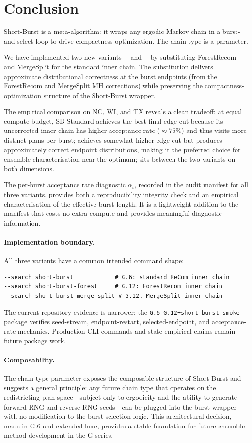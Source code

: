 \section{Conclusion}
\label{sec:conclusion}

Short-Burst is a meta-algorithm: it wraps any ergodic Markov chain in a
burst-and-select loop to drive compactness optimization.
The chain type is a parameter.

We have implemented two new variants---\sbf{} and \sbms{}---by substituting
ForestRecom and MergeSplit for the standard \recom{} inner chain.
The substitution delivers approximate distributional correctness at the
burst endpoints (from the ForestRecom and MergeSplit MH corrections) while
preserving the compactness-optimization structure of the Short-Burst wrapper.

The empirical comparison on NC, WI, and TX reveals a clean tradeoff:
at equal compute budget, SB-Standard achieves the best final edge-cut because
its uncorrected \recom{} inner chain has higher acceptance rate ($\approx 75\%$)
and thus visits more distinct plans per burst;
\sbf{} achieves somewhat higher edge-cut but produces approximately correct
endpoint distributions, making it the preferred choice for ensemble
characterisation near the optimum;
\sbms{} sits between the two variants on both dimensions.

The per-burst acceptance rate diagnostic $\alpha_i$, recorded in the audit
manifest for all three variants, provides both a reproducibility integrity
check and an empirical characterisation of the effective burst length.
It is a lightweight addition to the manifest that costs no extra compute
and provides meaningful diagnostic information.

\paragraph{Implementation boundary.}
All three variants have a common intended command shape:
\begin{verbatim}
--search short-burst            # G.6: standard ReCom inner chain
--search short-burst-forest     # G.12: ForestRecom inner chain
--search short-burst-merge-split # G.12: MergeSplit inner chain
\end{verbatim}
The current repository evidence is narrower: the
\texttt{G.6-G.12+short-burst-smoke} package verifies seed-stream,
endpoint-restart, selected-endpoint, and acceptance-rate mechanics.  Production
CLI commands and state empirical claims remain future package work.

\paragraph{Composability.}
The chain-type parameter exposes the composable structure of Short-Burst
and suggests a general principle: any future chain type that operates on
the redistricting plan space---subject only to ergodicity and the ability
to generate forward-RNG and reverse-RNG seeds---can be plugged into the
burst wrapper with no modification to the burst-selection logic.
This architectural decision, made in G.6 and extended here, provides a
stable foundation for future ensemble method development in the G series.
